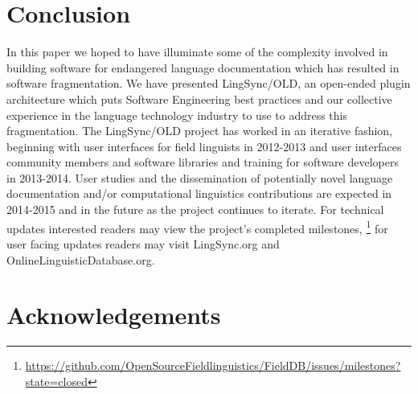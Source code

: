 \documentclass[11pt]{article}
\begin{document}
\section{Conclusion}

In this paper we hoped to have illuminate some of the complexity involved in
building software for endangered language documentation which has resulted in software
fragmentation. We have presented LingSync/OLD,  an open-ended plugin
architecture which puts Software Engineering best practices and our collective
experience in the language technology industry  to use to address this
fragmentation. The LingSync/OLD project has worked in an iterative fashion,
beginning with user interfaces for field linguists in 2012-2013 and user
interfaces community members and software libraries and training for software
developers in 2013-2014. User studies and the dissemination of  potentially
novel language documentation and/or computational linguistics contributions are expected in 2014-2015 and in the future as
the project continues to iterate.  For technical updates interested readers may view the project's completed
milestones,%
\footnote{\url{https://github.com/OpenSourceFieldlinguistics/FieldDB/issues/milestones?state=closed}} %
for user facing updates readers may visit LingSync.org and
OnlineLinguisticDatabase.org.


\section*{Acknowledgements}
\end{document}
